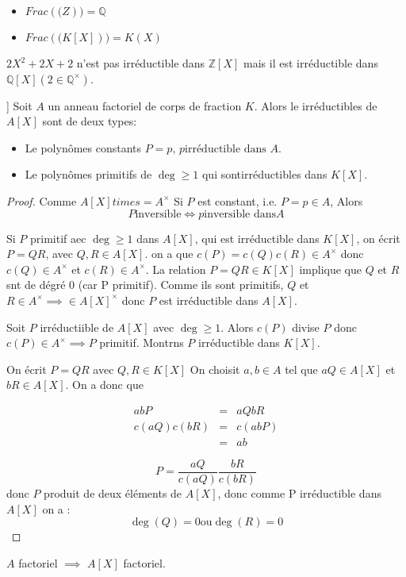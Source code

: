 \begin{exemple}
	\begin{itemize}
		\item $Frac(\mathbb(Z)) = \mathbb{Q}$
		\item $Frac(\mathbb(K[X])) = K(X)$
	\end{itemize}
\end{exemple}


\begin{exemple}
	$2X^2 + 2X +2$ n'est pas irréductible dans $\mathbb{Z}[X]$ mais il est irréductible dans $\mathbb{Q}[X] (2 \in \mathbb{Q}^\times)$.
\end{exemple}


\begin{theorem}[Clasification des irréductibles dans A[X]]
	Soit $A$ un anneau factoriel de corps de fraction $K$.
	Alors le irréductibles de $A[X]$ sont de deux types:
	\begin{itemize}
		\item Le polynômes constants $P = p, \, p \text{irréductible dans } A$.
		\item Le polynômes primitifs de $\deg \geq 1 $ qui sontirréductibles dans $K[X]$.
	\end{itemize}
\end{theorem}


\begin{proof}
	Comme $A[X]times = A^\times$
	Si $P$ est constant, i.e. $P = p \in A$,
	Alors
	$$ P \text{inversible} \iff p \text{inversible dans} A $$

	Si $P$ primitif aec $\deg \geq 1$ dans $A[X]$, qui est irréductible dans $K[X]$, on écrit
	$P = QR$, avec $Q,R \in A[X]$.
	on a que
	$c(P) = c(Q) c(R) \in A^\times$ donc $c(Q) \in A^\times$ et $c(R) \in A^\times$.
	La relation $P = QR \in K[X]$ implique que $Q$ et $R$ snt de dégré 0 (car P primitif).
	Comme ils sont primitifs, $Q$ et $R \in A^\times \implies \in A[X]^\times$
	donc $P$ est irréductible dans $A[X]$.


	Soit $P$ irréductiible de $A[X]$ avec $\deg \geq 1$.
	Alors $c(P)$ divise $P$ donc $c(P) \in A^\times \implies P$ primitif.
	Montrns $P$ irréductible dans $K[X]$.

	On écrit $P = QR $ avec $Q,R \in K[X]$ On choisit $a,b \in A$ tel que $aQ \in A[X]$ et  $bR \in A[X]$.
	On a donc que

	\begin{eqnarray*}
		abP &=& aQbR \\
		c(aQ)c(bR) &=& c(abP) \\
		&=& ab
	\end{eqnarray*}

	$$P = \frac{aQ}{c(aQ)} \frac{bR}{c(bR)} $$
	donc $P$ produit de deux éléments de $A[X]$, donc comme P irréductible dans
	$A[X]$ on a : $$ \deg (Q)= 0 \text{ou} \deg(R) = 0 $$
\end{proof}


\begin{theorem} [Admis]
	$A$ factoriel $\implies$ $A[X]$ factoriel.
\end{theorem}


